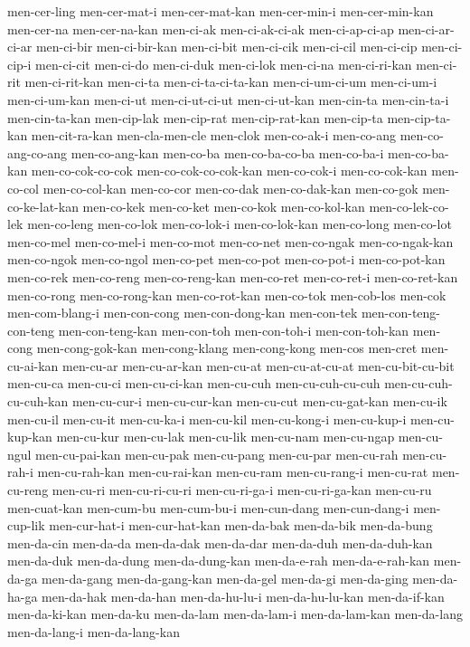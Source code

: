 {men-cer-ling men-cer-mat-i men-cer-mat-kan men-cer-min-i men-cer-min-kan
men-cer-na men-cer-na-kan men-ci-ak men-ci-ak-ci-ak men-ci-ap-ci-ap
men-ci-ar-ci-ar men-ci-bir men-ci-bir-kan men-ci-bit men-ci-cik men-ci-cil
men-ci-cip men-ci-cip-i men-ci-cit men-ci-do men-ci-duk men-ci-lok
men-ci-na men-ci-ri-kan men-ci-rit men-ci-rit-kan men-ci-ta
men-ci-ta-ci-ta-kan men-ci-um-ci-um men-ci-um-i men-ci-um-kan men-ci-ut
men-ci-ut-ci-ut men-ci-ut-kan men-cin-ta men-cin-ta-i men-cin-ta-kan
men-cip-lak men-cip-rat men-cip-rat-kan men-cip-ta men-cip-ta-kan
men-cit-ra-kan men-cla-men-cle men-clok men-co-ak-i men-co-ang
men-co-ang-co-ang men-co-ang-kan men-co-ba men-co-ba-co-ba men-co-ba-i
men-co-ba-kan men-co-cok-co-cok men-co-cok-co-cok-kan men-co-cok-i
men-co-cok-kan men-co-col men-co-col-kan men-co-cor men-co-dak
men-co-dak-kan men-co-gok men-co-ke-lat-kan men-co-kek men-co-ket
men-co-kok men-co-kol-kan men-co-lek-co-lek men-co-leng men-co-lok
men-co-lok-i men-co-lok-kan men-co-long men-co-lot men-co-mel men-co-mel-i
men-co-mot men-co-net men-co-ngak men-co-ngak-kan men-co-ngok men-co-ngol
men-co-pet men-co-pot men-co-pot-i men-co-pot-kan men-co-rek men-co-reng
men-co-reng-kan men-co-ret men-co-ret-i men-co-ret-kan men-co-rong
men-co-rong-kan men-co-rot-kan men-co-tok men-cob-los men-cok
men-com-blang-i men-con-cong men-con-dong-kan men-con-tek
men-con-teng-con-teng men-con-teng-kan men-con-toh men-con-toh-i
men-con-toh-kan men-cong men-cong-gok-kan men-cong-klang men-cong-kong
men-cos men-cret men-cu-ai-kan men-cu-ar men-cu-ar-kan men-cu-at
men-cu-at-cu-at men-cu-bit-cu-bit men-cu-ca men-cu-ci men-cu-ci-kan
men-cu-cuh men-cu-cuh-cu-cuh men-cu-cuh-cu-cuh-kan men-cu-cur-i
men-cu-cur-kan men-cu-cut men-cu-gat-kan men-cu-ik men-cu-il men-cu-it
men-cu-ka-i men-cu-kil men-cu-kong-i men-cu-kup-i men-cu-kup-kan
men-cu-kur men-cu-lak men-cu-lik men-cu-nam men-cu-ngap men-cu-ngul
men-cu-pai-kan men-cu-pak men-cu-pang men-cu-par men-cu-rah men-cu-rah-i
men-cu-rah-kan men-cu-rai-kan men-cu-ram men-cu-rang-i men-cu-rat
men-cu-reng men-cu-ri men-cu-ri-cu-ri men-cu-ri-ga-i men-cu-ri-ga-kan
men-cu-ru men-cuat-kan men-cum-bu men-cum-bu-i men-cun-dang men-cun-dang-i
men-cup-lik men-cur-hat-i men-cur-hat-kan men-da-bak men-da-bik
men-da-bung men-da-cin men-da-da men-da-dak men-da-dar men-da-duh
men-da-duh-kan men-da-duk men-da-dung men-da-dung-kan men-da-e-rah
men-da-e-rah-kan men-da-ga men-da-gang men-da-gang-kan men-da-gel
men-da-gi men-da-ging men-da-ha-ga men-da-hak men-da-han men-da-hu-lu-i
men-da-hu-lu-kan men-da-if-kan men-da-ki-kan men-da-ku men-da-lam
men-da-lam-i men-da-lam-kan men-da-lang men-da-lang-i men-da-lang-kan
}
